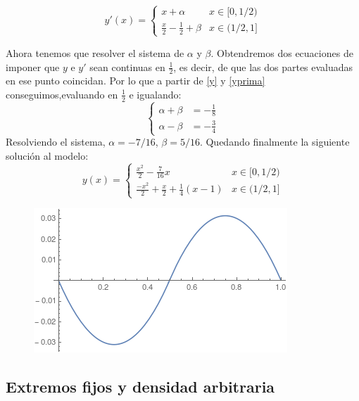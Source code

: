 \begin{equation}\label{yprima}
y'(x)=\left\{
\begin{array}{cc}
x+\alpha & x\in[0,1/2) \\
\frac{x}{2}-\frac{1}{2}+\beta & x\in(1/2,1]
\end{array}
\right.
\end{equation}

Ahora tenemos que resolver el sistema de $\alpha$ y $\beta$. Obtendremos dos ecuaciones de imponer que $y$ e $y'$ sean continuas en $\frac{1}{2}$, es decir, de que las dos partes evaluadas en ese punto coincidan. Por lo que a partir de \eqref{y} y \eqref{yprima} conseguimos,evaluando en $\frac{1}{2}$ e igualando:
\begin{equation}
\left\{
\begin{array}{cc}
\alpha+\beta & = -\frac{1}{8}\\
\alpha-\beta & =-\frac{3}{4}
\end{array}
\right.
\end{equation}
Resolviendo el sistema, $\alpha=-7/16$, $\beta=5/16$. Quedando finalmente la siguiente solución al modelo:
\begin{equation}
y(x)=\left\{
\begin{array}{cc}
\frac{x^2}{2}-\frac{7}{16}x & x\in[0,1/2) \\
\frac{-x^2}{2}+\frac{x}{2}+\frac{1}{4}(x-1) & x\in(1/2,1]
\end{array}
\right.
\end{equation}

\begin{figure}[h]
   \center
  \includegraphics[scale=0.6]{img/puenteflotante.png}
\end{figure}

\subsection{Extremos fijos y densidad arbitraria}

